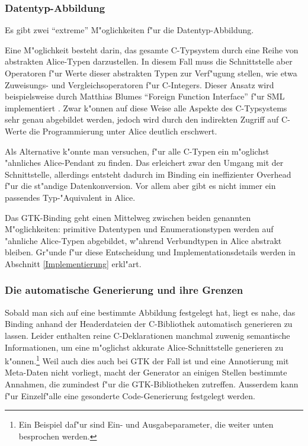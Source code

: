 \documentclass[a4paper,titlepage]{article}
\begin{document}
\subsubsection*{Datentyp-Abbildung}

Es gibt zwei ``extreme'' M"oglichkeiten f"ur die Datentyp-Abbildung.

Eine M"oglichkeit besteht darin, das gesamte C-Typsystem durch eine Reihe von
abstrakten Alice-Typen darzustellen. In diesem Fall muss die Schnittstelle
aber Operatoren f"ur Werte dieser abstrakten Typen zur Verf"ugung stellen,
wie etwa Zuweisungs- und Vergleichsoperatoren f"ur C-Integers.
Dieser Ansatz wird beispielsweise durch Matthias Blumes
``Foreign Function Interface'' f"ur SML implementiert \cite{blume}.
Zwar k"onnen auf diese Weise alle Aspekte des C-Typsystems sehr genau
abgebildet werden, jedoch wird durch den indirekten Zugriff auf C-Werte die
Programmierung unter Alice deutlich erschwert.

Als Alternative k"onnte man versuchen, f"ur alle C-Typen ein m"oglichst
"ahnliches Alice-Pendant zu finden. Das erleichert zwar den Umgang mit
der Schnittstelle, allerdings entsteht
dadurch im Binding ein ineffizienter Overhead f"ur die st"andige
Datenkonversion. Vor allem aber gibt es nicht immer
ein passendes Typ-"Aquivalent in Alice.

Das GTK-Binding geht einen Mittelweg zwischen beiden genannten M"oglichkeiten:
primitive Datentypen und Enumerationstypen werden auf "ahnliche Alice-Typen
abgebildet, w"ahrend Verbundtypen in Alice abstrakt bleiben.
Gr"unde f"ur diese Entscheidung und Implementationsdetails werden in Abschnitt
\ref{Implementierung} erkl"art.

\subsubsection*{Die automatische Generierung und ihre Grenzen}

Sobald man sich auf eine bestimmte Abbildung festgelegt hat, liegt es nahe,
das Binding anhand der Headerdateien der C-Bibliothek automatisch generieren zu
lassen. Leider enthalten reine C-Deklarationen manchmal zuwenig semantische
Informationen, um eine m"oglichst akkurate Alice-Schnittstelle generieren
zu k"onnen.\footnote{Ein Beispiel daf"ur sind Ein- und Ausgabeparameter, die
weiter unten besprochen werden.} Weil auch dies auch bei GTK der Fall
ist und eine Annotierung mit Meta-Daten nicht vorliegt, macht der Generator
an einigen Stellen bestimmte Annahmen, die zumindest f"ur die GTK-Bibliotheken
zutreffen. Ausserdem kann f"ur Einzelf"alle eine gesonderte Code-Generierung
festgelegt werden.
\end{document}
